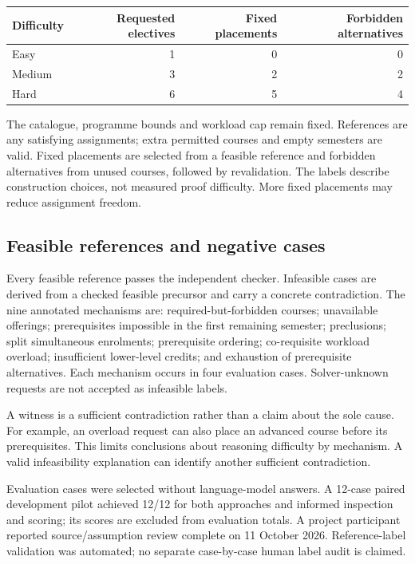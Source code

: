 \documentclass[11pt,a4paper]{article}
\begin{document}
\begin{center}
\begin{minipage}{\linewidth}
\label{tab:difficulty}
\begin{tabular}{@{}lrrr@{}}
\toprule
Difficulty & Requested electives & Fixed placements & Forbidden alternatives\\
\midrule
Easy & 1 & 0 & 0\\
Medium & 3 & 2 & 2\\
Hard & 6 & 5 & 4\\
\bottomrule
\end{tabular}
\end{minipage}
\end{center}

The catalogue, programme bounds and workload cap remain fixed. References
are any satisfying assignments; extra permitted courses and empty semesters
are valid. Fixed placements are selected from a feasible reference and
forbidden alternatives from unused courses, followed by revalidation.
The labels describe construction choices, not measured proof difficulty.
More fixed placements may reduce assignment freedom.

\subsection{Feasible references and negative cases}
Every feasible reference passes the independent checker. Infeasible cases
are derived from a checked feasible precursor and carry a concrete
contradiction. The nine annotated mechanisms are: required-but-forbidden
courses; unavailable offerings; prerequisites impossible in the first
remaining semester; preclusions; split simultaneous enrolments; prerequisite
ordering; co-requisite workload overload; insufficient lower-level credits;
and exhaustion of prerequisite alternatives. Each mechanism occurs in four
evaluation cases. Solver-unknown requests are not accepted as infeasible
labels.

A witness is a sufficient contradiction rather than a claim about the sole
cause. For example, an overload request can also place an advanced course
before its prerequisites. This limits conclusions about reasoning difficulty
by mechanism. A valid infeasibility explanation can identify another sufficient
contradiction.

Evaluation cases were selected without language-model answers. A 12-case
paired development pilot achieved 12/12 for both approaches and informed
inspection and scoring; its scores are excluded from evaluation totals.
A project participant reported source/assumption review complete on
11 October 2026. Reference-label validation was automated; no separate
case-by-case human label audit is claimed.
\end{document}

